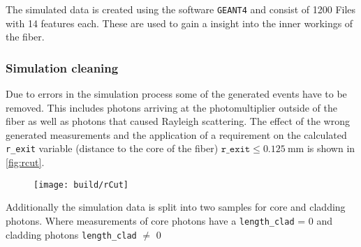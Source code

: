 The simulated data is created using the software \texttt{GEANT4} and consist of 1200 Files with 14 features each. These are used to gain a insight into the inner workings of the fiber. 
\subsubsection{Simulation cleaning}
Due to errors in the simulation process some of the generated events have to be removed. 
This includes photons arriving at the photomultiplier outside of the fiber as well as photons that caused Rayleigh scattering. 
The effect of the wrong generated measurements and the application of a requirement on the calculated \texttt{r\_exit} variable 
(distance to the core of the fiber) $\mathtt{r\_exit}\leq \qty{0.125}{\milli\meter}$ is shown in \autoref{fig:rcut}.

\begin{figure}
	\centering
	\texttt{[image: build/rCut]}
	\caption{}
	\label{fig:rcut}
\end{figure}

Additionally the simulation data is split into two samples for core and cladding photons. Where measurements of core photons have a \texttt{length\_clad} = 0 and cladding photons \texttt{length\_clad} $\neq$ 0








































